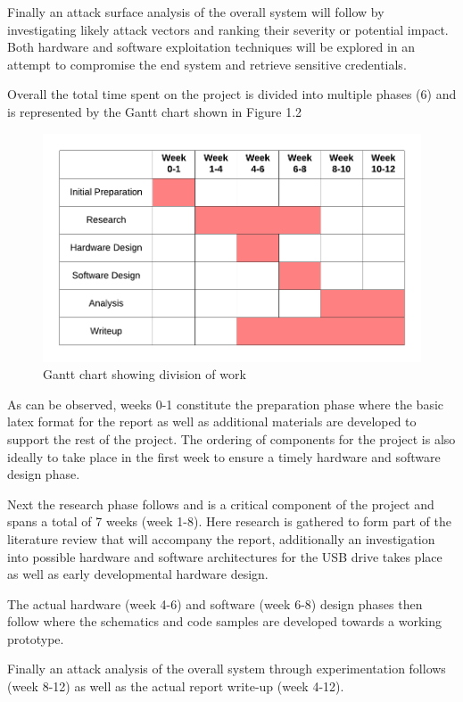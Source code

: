   
  Finally an attack surface analysis of the overall system will follow by investigating likely attack vectors and ranking their severity or potential impact. Both hardware and software exploitation techniques will be explored in an attempt to compromise the end system and retrieve sensitive credentials.
  
  Overall the total time spent on the project is divided into multiple phases (6) and is represented by the Gantt chart shown in Figure 1.2
  
\begin{figure}[H]
\centering
\includegraphics[width=0.8\columnwidth]{Figures/Fig_72.png}
\caption{Gantt chart showing division of work}
\label{fig:gantt}
\end{figure}

  As can be observed, weeks 0-1 constitute the preparation phase where the basic latex format for the report as well as additional materials are developed to support the rest of the project. The ordering of components for the project is also ideally to take place in the first week to ensure a timely hardware and software design phase.
  
  Next the research phase follows and is a critical component of the project and spans a total of 7 weeks (week 1-8). Here research is gathered to form part of the literature review that will accompany the report, additionally an investigation into possible hardware and software architectures for the USB drive takes place as well as early developmental hardware design.
  
  The actual hardware (week 4-6) and software (week 6-8) design phases then follow where the schematics and code samples are developed towards a working prototype.
  
  Finally an attack analysis of the overall system through experimentation follows (week 8-12) as well as the actual report write-up (week 4-12).